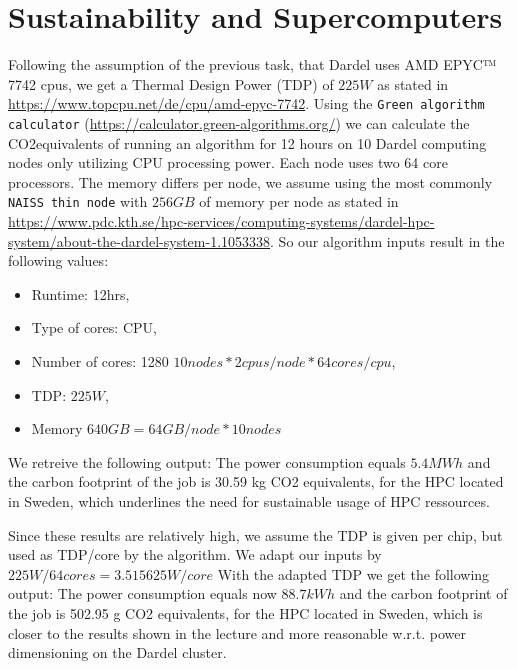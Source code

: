 \documentclass[a4paper,10pt]{article}
\begin{document}
\section{Sustainability and Supercomputers}
  Following the assumption of the previous task, that Dardel uses AMD EPYC™ 7742 cpus, we get a Thermal Design Power (TDP) of $ 225 W $ as stated in \url{https://www.topcpu.net/de/cpu/amd-epyc-7742}.
  Using the \verb|Green algorithm calculator| (\url{https://calculator.green-algorithms.org/}) we can calculate the CO2equivalents of running an algorithm for 12 hours on 10 Dardel computing nodes only utilizing CPU processing power.
  Each node uses two 64 core processors. The memory differs per node, we assume using the most commonly \verb|NAISS thin node| with $256GB $ of memory per node as stated in \url{https://www.pdc.kth.se/hpc-services/computing-systems/dardel-hpc-system/about-the-dardel-system-1.1053338}.
  So our algorithm inputs result in the following values:
  \begin{itemize}
    \item Runtime: 12hrs,
    \item Type of cores: CPU,
    \item Number of cores: 1280 $10 nodes*2 cpus/node*64cores/cpu$, 
    \item TDP: $225 W$,
    \item Memory $ 640 GB = 64GB/node * 10 nodes$
  \end{itemize}

  We retreive the following output:
  The power consumption equals $5.4 MWh$ and the carbon footprint of the job is 30.59 kg CO2 equivalents,
  for the HPC located in Sweden, which underlines the need for sustainable usage of HPC ressources.

  Since these results are relatively high, we assume the TDP is given per chip, but used as TDP/core by the algorithm. We adapt our inputs by $225W/64cores = 3.515625 W/core$
  With the adapted TDP we get the following output:
  The power consumption equals now $88.7 kWh$ and the carbon footprint of the job is 502.95 g CO2 equivalents,
  for the HPC located in Sweden, which is closer to the results shown in the lecture and more reasonable w.r.t. power dimensioning on the Dardel cluster.
 
 
 
\end{document}
